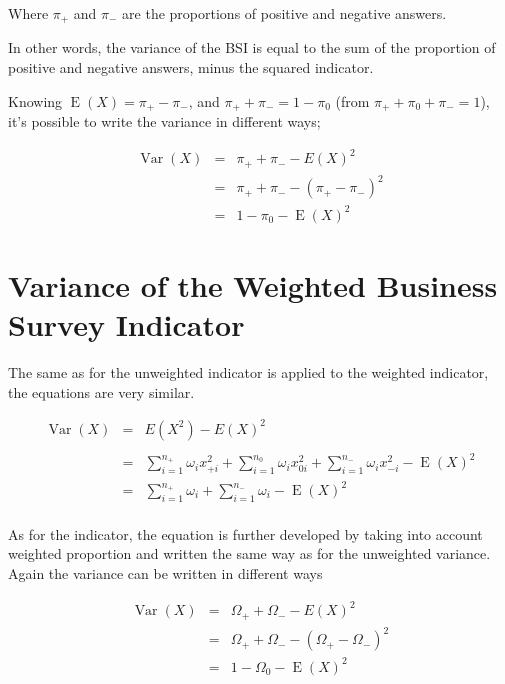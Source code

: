\documentclass[12pt,a4paper,oneside]{book}
\DeclareMathOperator{\Var}{Var}
\DeclareMathOperator{\E}{E}
\begin{document}
Where $\pi_+$ and $\pi_-$ are the proportions of positive and negative answers.

In other words, the variance of the BSI is equal to the sum of the proportion of positive and negative answers, minus the squared indicator.

Knowing $\E(X)=\pi_+ - \pi_-$, and $\pi_+ + \pi_- = 1 - \pi_0$ (from $\pi_+ + \pi_0 + \pi_- = 1$),
it's possible to write the variance in different ways;


\begin{eqnarray}
\Var(X) &=& \pi_+ + \pi_- - E ( X )^2  \nonumber \\
        &=& \pi_+ + \pi_- - ( \pi_+ - \pi_- )^2 \label{eq:var2} \\
        &=& 1 - \pi_0 - \E(X)^2 \label{eq:var3}
\end{eqnarray}




\section{Variance of the Weighted Business Survey Indicator}

The same as for the unweighted indicator is applied to the weighted indicator, the equations are very similar.

\begin{eqnarray}
\Var(X) &=&  E\left( X^2\right) - E\left( X\right)^2 \nonumber \\ \nonumber \\
    &=& \sum_{i=1}^{n_+} \omega_i x_{+i}^2 + \sum_{i=1}^{n_0} \omega_i x_{0i}^2  + \sum_{i=1}^{n_-} \omega_i x_{-i}^2 - \E(X)^2 \\
    &=& \sum_{i=1}^{n_+} \omega_i + \sum_{i=1}^{n_-} \omega_i - \E(X)^2 \nonumber \\
\end{eqnarray}

As for the indicator, the equation is further developed by taking into account weighted proportion and written the same way as for the unweighted variance. 
Again the variance can be written in different ways

\begin{eqnarray}
\Var(X) &=& \Omega_+ + \Omega_- - E ( X )^2 \\
	&=& \Omega_+ + \Omega_- - ( \Omega_+ - \Omega_- )^2 \\
    &=& 1 - \Omega_{0} - \E(X)^2 \label{eq:var3 weighted}
\end{eqnarray}
\end{document}
